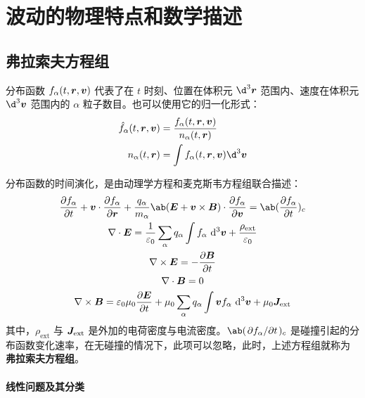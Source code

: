 
\chapter{波动的物理特点和数学描述}

\section{弗拉索夫方程组}

分布函数 $f_\alpha(t, \bm{r}, \bm{v})$ 代表了在 $t$ 时刻、位置在体积元 $\d^3\vector{r}$ 范围内、速度在体积元 $\d^3\vector{v}$ 范围内的 $\alpha$ 粒子数目。也可以使用它的归一化形式：
\begin{subequations}\begin{align}
\hat{f}_\alpha(t, \vector{r}, \vector{v}) &
= \frac{f_\alpha(t, \vector{r}, \vector{v})}
{n_\alpha(t, \vector{r})} \\
n_\alpha(t, \vector{r}) &= \int f_\alpha(t, \vector{r}, \vector{v}) \d^3\vector{v}
\end{align}\end{subequations}

分布函数的时间演化，是由动理学方程和麦克斯韦方程组联合描述：
\begin{subequations}\begin{gather}
\pdv{f_\alpha}{t}
+ \vector{v} \cdot \pdv{f_\alpha}{\vector{r}}
+ \frac{q_\alpha}{m_\alpha} \ab(
    \vector{E} + \vector{v} \times \vector{B}
) \cdot \pdv{f_\alpha}{\vector{v}}
= \ab(\pdv{f_\alpha}{t})_c \\
\dive{\vector{E}} = \frac{1}{\varepsilon_0}
\sum_\alpha q_\alpha \int f_\alpha \, \dif^3 \vector{v}
+ \frac{\rho_{\text{ext}}}{\varepsilon_0} \\
\curl{\vector{E}} = - \pdv{\vector{B}}{t} \\
\dive{\vector{B}} = 0 \\
\curl{\vector{B}} = \varepsilon_0 \mu_0 \pdv{\vector{E}}{t}
+ \mu_0 \sum_\alpha q_\alpha \int \vector{v} f_\alpha \, \dif^3 \vector{v}
+ \mu_0 \vector{J}_{\text{ext}}
\end{gather}\end{subequations}
其中，$\rho_{\text{ext}}$ 与 $\bm{J}_{\text{ext}}$ 是外加的电荷密度与电流密度。$\ab(\pdv{f_\alpha}/{t})_c$ 是碰撞引起的分布函数变化速率，在无碰撞的情况下，此项可以忽略，此时，上述方程组就称为 \textbf{弗拉索夫方程组}。

\subsubsection{线性问题及其分类}

